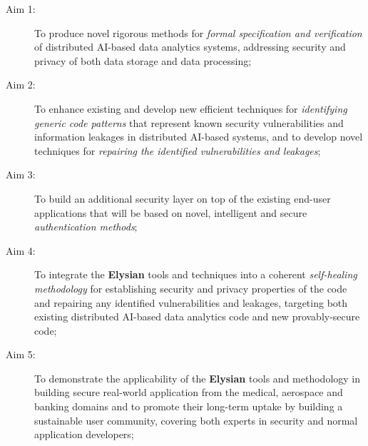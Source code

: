 \documentclass[a4paper,11pt]{article}
\newcommand{\project}[1]{\textbf{#1}\xspace}
\newcommand{\SECURITY}{\project{Elysian}}
\newcommand{\TheProject}{\SECURITY}
\begin{document}
\begin{description}
\item[Aim 1:] To produce novel rigorous methods for \emph{formal specification and verification} of 
  distributed AI-based data analytics systems, addressing security and privacy of both data storage and data processing;

\item[Aim 2:] To %
enhance existing and develop new efficient techniques for \emph{identifying generic code patterns} that
  represent known security vulnerabilities and information leakages in distributed AI-based systems, and to develop novel techniques for  
  \emph{repairing the identified vulnerabilities and leakages};

\item[Aim 3:] To build an additional security layer on top of the existing end-user applications that will be based on novel, intelligent and secure \emph{authentication methods};

\item[Aim 4:] To integrate the \TheProject{} tools and techniques into a coherent \emph{self-healing methodology} for establishing
  security and privacy properties of the code and repairing any identified vulnerabilities and leakages, targeting both 
  existing distributed AI-based data analytics code and new provably-secure code;

\item[Aim 5:]  To demonstrate the applicability of the \TheProject{} tools and
 methodology in building secure real-world application from the medical, aerospace and
 banking domains and to promote their long-term uptake by building a sustainable user community,
 covering both experts in security and normal application developers;

\end{description}
\end{document}
